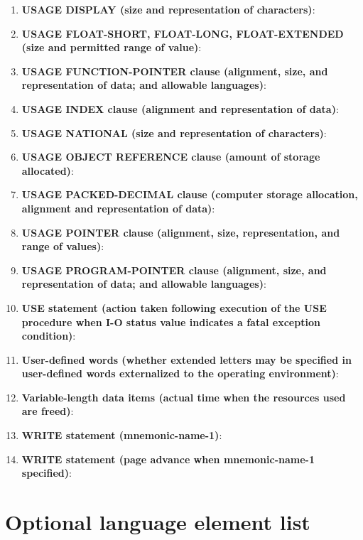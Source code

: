 \begin{enumerate}
\item \textbf{USAGE DISPLAY (size and representation of characters)}:
\item \textbf{USAGE FLOAT-SHORT, FLOAT-LONG, FLOAT-EXTENDED (size and permitted range of value)}:
\item \textbf{USAGE FUNCTION-POINTER clause (alignment, size, and representation of data; and allowable languages)}:
\item \textbf{USAGE INDEX clause (alignment and representation of data)}:
\item \textbf{USAGE NATIONAL (size and representation of characters)}:
\item \textbf{USAGE OBJECT REFERENCE clause (amount of storage allocated)}:
\item \textbf{USAGE PACKED-DECIMAL clause (computer storage allocation, alignment and representation of data)}:
\item \textbf{USAGE POINTER clause (alignment, size, representation, and range of values)}:
\item \textbf{USAGE PROGRAM-POINTER clause (alignment, size, and representation of data; and allowable languages)}:
\item \textbf{USE statement (action taken following execution of the USE procedure when I-O status value indicates a fatal exception condition)}:
\item \textbf{User-defined words (whether extended letters may be specified in user-defined words externalized to the operating environment)}:
\item \textbf{Variable-length data items (actual time when the resources used are freed)}:
\item \textbf{WRITE statement (mnemonic-name-1)}:
\item \textbf{WRITE statement (page advance when mnemonic-name-1 specified)}:
\end{enumerate}

\section{Optional language element list}


